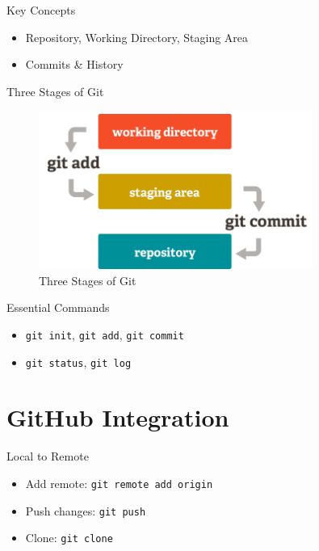 \documentclass[aspectratio=169]{beamer} %
\begin{document}
\begin{frame}{Key Concepts}
  \begin{itemize}
    \item Repository, Working Directory, Staging Area
    \item Commits \& History
  \end{itemize}
\end{frame}

\begin{frame}{Three Stages of Git}
  \begin{figure}
    \centering
    \includegraphics[width=0.8\textwidth]{res/stages.png}
    \caption{Three Stages of Git}
  \end{figure}
\end{frame}

\begin{frame}{Essential Commands}
  \begin{itemize}
    \item \texttt{git init}, \texttt{git add}, \texttt{git commit}
    \item \texttt{git status}, \texttt{git log}
  \end{itemize}
\end{frame}

\section{GitHub Integration}

\begin{frame}{Local to Remote}
  \begin{itemize}
    \item Add remote: \texttt{git remote add origin}
    \item Push changes: \texttt{git push}
    \item Clone: \texttt{git clone}
  \end{itemize}
\end{frame}
\end{document}
